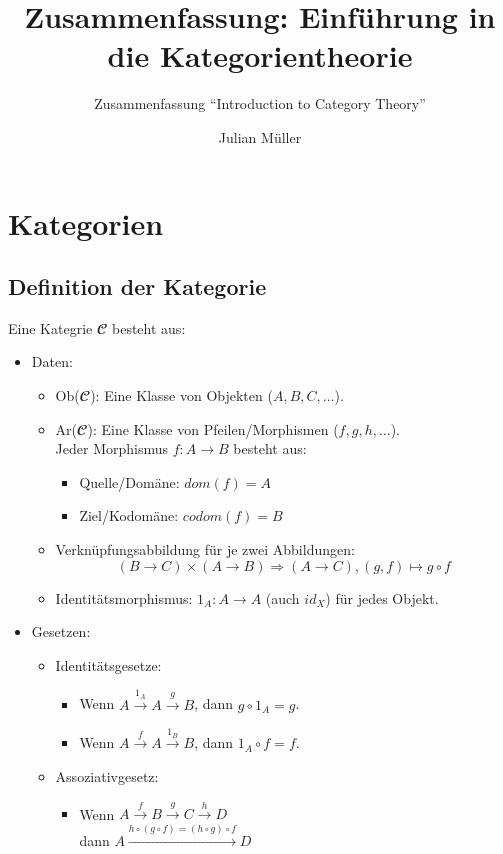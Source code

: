 \documentclass[parskip=half]{scrreprt}
\begin{document}
\title{Zusammenfassung: Einführung in die Kategorientheorie}
\subtitle{Zusammenfassung \enquote{Introduction to Category Theory}}
\author{Julian Müller}
\maketitle
\tableofcontents

\part{Kategorien}

\chapter{Definition der Kategorie}

\begin{definition}[Kategorie]
Eine Kategrie $𝓒$ besteht aus:
\begin{itemize}[leftmargin=1em]
\item Daten: 
	\begin{itemize}
	\item Ob($𝓒$): Eine Klasse von Objekten ($A, B, C, \dots$).
	\item Ar($𝓒$): Eine Klasse von Pfeilen/Morphismen ($f, g, h, \dots$). \\
		Jeder Morphismus $f : A → B$ besteht aus:
		\begin{itemize}
		\item Quelle/Domäne: $dom(f) = A$
		\item Ziel/Kodomäne: $codom(f) = B$
		\end{itemize}
	\item Verknüpfungsabbildung für je zwei Abbildungen:
		$$(B → C) × (A → B) ⇒ (A → C), (g,f) ↦ g ∘ f$$
	\item Identitätsmorphismus: $1_A : A → A$ (auch $id_X$) für jedes Objekt.
	\end{itemize}
\item Gesetzen:
	\begin{itemize}
	\item Identitätsgesetze:
		\begin{itemize}
		\item Wenn $A \xrightarrow{1_A} A \xrightarrow{g} B$, dann $g ∘ 1_A = g$.
		\item Wenn $A \xrightarrow{f} A \xrightarrow{1_B} B$, dann $1_A ∘ f = f$.
		\end{itemize}
	\item Assoziativgesetz:
		\begin{itemize}
		\item Wenn $A \xrightarrow{f} B \xrightarrow{g} C \xrightarrow{h} D$\\ 
			dann $A \xrightarrow{h∘(g∘f)=(h∘g)∘f} D $
		\end{itemize}
	\end{itemize}
\end{itemize}
\end{definition}
\end{document}
